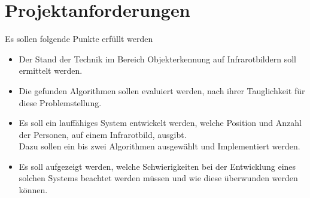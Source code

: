 \section{Projektanforderungen}
\label{sec:Requirements}

Es sollen folgende Punkte erfüllt werden

\begin{itemize}
	\item Der Stand der Technik im Bereich Objekterkennung auf Infrarotbildern soll ermittelt werden.
	\item Die gefunden Algorithmen sollen evaluiert werden, nach ihrer Tauglichkeit für diese Problemstellung.
	\item Es soll ein lauffähiges System entwickelt werden, welche Position und Anzahl der Personen, auf einem Infrarotbild, ausgibt.\\
	Dazu sollen ein bis zwei Algorithmen ausgewählt und Implementiert werden.
	\item Es soll aufgezeigt werden, welche Schwierigkeiten bei der Entwicklung eines solchen Systems beachtet werden müssen und wie diese überwunden werden können.

\end{itemize}



